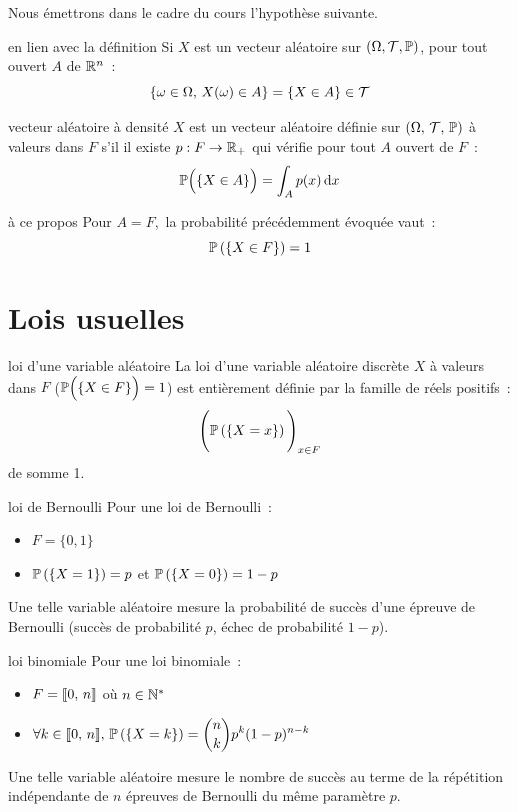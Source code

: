 Nous émettrons dans le cadre du cours l'hypothèse suivante.
\begin{remarque}{}{en lien avec la définition}
    Si $X$ est un vecteur aléatoire sur $(\Omega, \mathcal{T}, \mathbb{P})$, pour tout ouvert $A$ de $\mathbb{R}^n$~:
    $$\{\omega \in \Omega,\, X(\omega) \in A\} = \{X \in A\} \in \mathcal{T}$$
\end{remarque}

\begin{definition}{}{vecteur aléatoire à densité}
    $X$ est un vecteur aléatoire définie sur $(\Omega,\, \mathcal{T},\, \mathbb{P})$ à valeurs dans $F$ s'il il existe $p : F \to \mathbb{R}_+$ qui vérifie pour tout $A$ ouvert de $F$~:
    $$\mathbb{P}\Big(\{X \in A\}\Big) = \int_A p(x)\,\mathrm{d}x$$
\end{definition}

\begin{remarque}{}{à ce propos}
    Pour $A = F$,\, la probabilité précédemment évoquée vaut~:
    $$\mathbb{P}\left(\left\{X \in F\right\}\right) = 1$$
\end{remarque}


\section{Lois usuelles}

\begin{definition}{}{loi d'une variable aléatoire}
    La loi d'une variable aléatoire discrète $X$ à valeurs dans $F$ (\ie $\mathbb{P}\Big(\{X \in F\}\Big)=1$) est entièrement définie par la famille de réels positifs~:
    $$\Bigg(\mathbb{P}\left(\left\{X = x\right\}\right)\Bigg)_{x \in F}$$
    de somme 1.
\end{definition}

\begin{exemple}{}{loi de Bernoulli}
    Pour une loi de Bernoulli~:
    \begin{itemize}
        \item $\displaystyle F = \{0, 1\}$
        \item $\displaystyle \mathbb{P}\left(\left\{X = 1\right\}\right) = p$ et $\mathbb{P}\left(\left\{X = 0\right\}\right) = 1-p$
    \end{itemize}
    Une telle variable aléatoire mesure la probabilité de succès d'une épreuve de Bernoulli (succès de probabilité $p$, échec de probabilité $1-p$).
\end{exemple}

\begin{exemple}{}{loi binomiale}
    Pour une loi binomiale~:
    \begin{itemize}
        \item $\displaystyle F = \llbracket 0 ,\, n \rrbracket$ où $n \in \mathbb{N}^*$
        \item $\displaystyle \forall k \in \llbracket 0 ,\, n \rrbracket,\, \mathbb{P}\left(\left\{X = k\right\}\right) = \binom{n}{k}p^k(1-p)^{n-k}$
    \end{itemize}
    Une telle variable aléatoire mesure le nombre de succès au terme de la répétition indépendante de $n$ épreuves de Bernoulli du même paramètre $p$.
\end{exemple}

